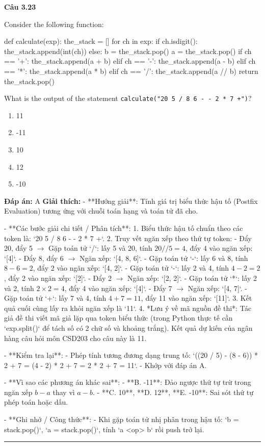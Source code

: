 \documentclass[11pt,a4paper]{article}
\newenvironment{question}[1]{%
  \par\vspace{1em}\noindent\textbf{\large Câu #1}\par\vspace{0.4em}
}{%
  \par\vspace{1em}\hrule\vspace{0.6em}
}
\newenvironment{choices}{%
  \begin{enumerate}[label=\textbf{\Alph*.},leftmargin=2.2em,itemsep=2pt,topsep=3pt]
}{%
  \end{enumerate}
}
\newcommand{\choice}{\item}
\newenvironment{codebox}{%
  \begin{tcolorbox}[colback=gray!8!white,colframe=gray!50!black,arc=1.5mm,boxrule=0.6pt,left=3mm,right=3mm,top=2.5mm,bottom=2.5mm]
  \ttfamily\small
}{%
  \end{tcolorbox}
}
\begin{document}
\begin{question}{3.23}
Consider the following function:
\begin{codebox}
def calculate(exp):
    the_stack = []
    for ch in exp:
        if ch.isdigit():
            the_stack.append(int(ch))
        else:
            b = the_stack.pop()
            a = the_stack.pop()
            if ch == '+':
                the_stack.append(a + b)
            elif ch == '-':
                the_stack.append(a - b)
            elif ch == '*':
                the_stack.append(a * b)
            elif ch == '/':
                the_stack.append(a // b)
    return the_stack.pop()
\end{codebox}
What is the output of the statement \texttt{calculate("20 5 / 8 6 - - 2 * 7 +")}?
\begin{choices}
\choice 11
\choice -11
\choice 10
\choice 12
\choice -10
\end{choices}
\textbf{Đáp án:} A
\textbf{Giải thích:} - **Hướng giải**:
  Tính giá trị biểu thức hậu tố (Postfix Evaluation) tương ứng với chuỗi toán hạng và toán tử đã cho.

- **Các bước giải chi tiết / Phân tích**:
  1. Biểu thức hậu tố chuẩn theo các token là: `20 5 / 8 6 - - 2 * 7 +`.
  2. Truy vết ngăn xếp theo thứ tự token:
     - Đẩy 20, đẩy 5 \(\rightarrow\) Gặp toán tử `/`: lấy 5 và 20, tính \(20 // 5 = 4\), đẩy 4 vào ngăn xếp: `[4]`.
     - Đẩy 8, đẩy 6 \(\rightarrow\) Ngăn xếp: `[4, 8, 6]`.
     - Gặp toán tử `-`: lấy 6 và 8, tính \(8 - 6 = 2\), đẩy 2 vào ngăn xếp: `[4, 2]`.
     - Gặp toán tử `-`: lấy 2 và 4, tính \(4 - 2 = 2\), đẩy 2 vào ngăn xếp: `[2]`.
     - Đẩy 2 \(\rightarrow\) Ngăn xếp: `[2, 2]`.
     - Gặp toán tử `*`: lấy 2 và 2, tính \(2 \times 2 = 4\), đẩy 4 vào ngăn xếp: `[4]`.
     - Đẩy 7 \(\rightarrow\) Ngăn xếp: `[4, 7]`.
     - Gặp toán tử `+`: lấy 7 và 4, tính \(4 + 7 = 11\), đẩy 11 vào ngăn xếp: `[11]`.
  3. Kết quả cuối cùng lấy ra khỏi ngăn xếp là `11`.
  4. *Lưu ý về mã nguồn đề thi*: Tác giả đề thi viết mã giả lặp qua token biểu thức (trong Python thực tế cần `exp.split()` để tách số có 2 chữ số và khoảng trắng). Kết quả dự kiến của ngân hàng câu hỏi môn CSD203 cho câu này là 11.

- **Kiểm tra lại**:
  - Phép tính tương đương dạng trung tố: `((20 / 5) - (8 - 6)) * 2 + 7 = (4 - 2) * 2 + 7 = 2 * 2 + 7 = 11`.
  - Khớp với đáp án A.

- **Vì sao các phương án khác sai**:
  - **B. -11**: Đảo ngược thứ tự trừ trong ngăn xếp \(b - a\) thay vì \(a - b\).
  - **C. 10**, **D. 12**, **E. -10**: Sai sót thứ tự phép toán hoặc dấu.

- **Ghi nhớ / Công thức**:
  - Khi gặp toán tử nhị phân trong hậu tố: `b = stack.pop()`, `a = stack.pop()`, tính `a <op> b` rồi push trở lại.
\end{question}
\end{document}
